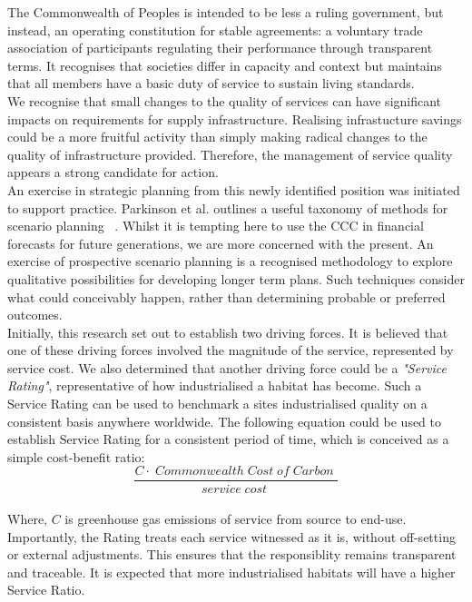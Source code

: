 \documentclass[10pt, oneside]{article}   	%
\begin{document}
The Commonwealth of Peoples is intended to be less a ruling government, but instead, an operating constitution for stable agreements: a voluntary trade association of participants regulating their performance through transparent terms.
It recognises that societies differ in capacity and context but maintains that all members have a basic duty of service to sustain living standards.\\

We recognise that small changes to the quality of services can have significant impacts on requirements for supply infrastructure.
Realising infrastucture savings could be a more fruitful activity than simply making radical changes to the quality of infrastructure provided.
Therefore, the management of service quality appears a strong candidate for action.\\

An exercise in strategic planning from this newly identified position was initiated to support practice.
Parkinson et al. outlines a useful taxonomy of methods for scenario planning ~\cite{atp1}.
Whilst it is tempting here to use the CCC in financial forecasts for future generations, we are more concerned with the present.
An exercise of prospective scenario planning is a recognised methodology to explore qualitative possibilities for developing longer term plans.
Such techniques consider what could conceivably happen, rather than determining probable or preferred outcomes.\\

Initially, this research set out to establish two driving forces.
It is believed that one of these driving forces involved the magnitude of the service, represented by service cost.
We also determined that another driving force could be a \emph{"Service Rating"}, representative of how industrialised a habitat has become.
Such a Service Rating can be used to benchmark a sites industrialised quality on a consistent basis anywhere worldwide.
The following equation could be used to establish Service Rating for a consistent period of time, which is conceived as a simple cost-benefit ratio:\\

\begin{equation}
	\frac{C  \cdot \;Commonwealth\; Cost\; of\; Carbon\;}{service\; cost\;}
\end{equation}\\

Where, $C$ is greenhouse gas emissions of service from source to end-use.
Importantly, the Rating treats each service witnessed as it is, without off-setting or external adjustments.
This ensures that the responsiblity remains transparent and traceable.
It is expected that more industrialised habitats will have a higher Service Ratio.\\
\end{document}
